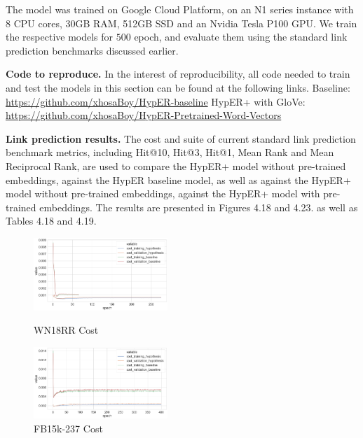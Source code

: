 
\noindent The model was trained on Google Cloud Platform, on an N1 series instance with  8 CPU cores, 30GB RAM, 512GB SSD and an Nvidia Tesla P100 GPU. We train the respective models for $ 500 $ epoch, and evaluate them using the standard link prediction benchmarks discussed earlier. \par 

\noindent \textbf{Code to reproduce.} In the interest of reproducibility, all code needed to train and test the models in this section can be found at the following links. \newline
Baseline: \url{https://github.com/xhosaBoy/HypER-baseline} \newline
HypER+ with GloVe: \url{https://github.com/xhosaBoy/HypER-Pretrained-Word-Vectors} \par

\noindent \textbf{Link prediction results.} The cost and suite of current standard link prediction benchmark metrics, including Hit@10, Hit@3, Hit@1, Mean Rank and Mean Reciprocal Rank, are used to compare the HypER+ model without pre-trained embeddings, against the HypER baseline model, as well as against the HypER+ model without pre-trained embeddings, against the HypER+ model with pre-trained embeddings. The results are presented in Figures 4.18 and 4.23. as well as Tables 4.18 and 4.19. \par


\bigskip

\begin{figure}[H]
	\parbox{.5\linewidth}{
   		\centering
    		\includegraphics[width=0.45\textwidth, height=0.2\textheight]{WN18RR_Cost_Results}
		\caption{WN18RR Cost}
		}
	\hfill
	\parbox{.5\linewidth}{
   		\centering
		\includegraphics[width=0.45\textwidth, height=0.2\textheight]{FB15k-237_Cost_Results}
		\caption{FB15k-237 Cost}
		}
\end{figure}

